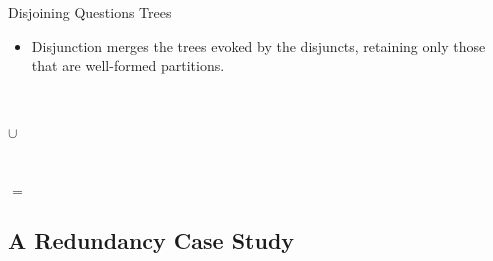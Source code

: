 \documentclass[10pt]{beamer}
\begin{document}
\begin{frame}{Disjoining Questions Trees}
	\begin{itemize}
		\item Disjunction merges the trees evoked by the disjuncts, retaining only those that are well-formed partitions.
	\end{itemize}
	\begin{minipage}{.27\linewidth}
		\centering
	\end{minipage}
	\hfill
	\begin{minipage}{.05\linewidth}
		\centering
		~\\~\\ \LARGE $\cup$
	\end{minipage}
	\hfill
	\begin{minipage}{.27\linewidth}
		\centering
	\end{minipage}
	\hfill
	\begin{minipage}{.05\linewidth}
		\centering
		~\\~\\ \LARGE $=$
	\end{minipage}
	\hfill
	\begin{minipage}{.27\linewidth}
		\centering
	\end{minipage}
\end{frame}

\begin{frame}
	\section[A Redundancy Case Study]{A Redundancy Case Study}
\end{frame}
\usebackgroundtemplate{}
\end{document}
